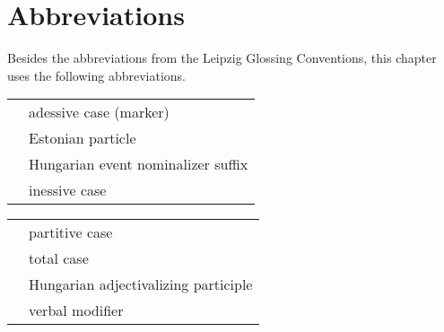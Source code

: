 \documentclass[output=paper,hidelinks]{langscibook}
\begin{document}
\section*{Abbreviations}

Besides the abbreviations from the Leipzig Glossing Conventions, this
chapter uses the following abbreviations.\medskip

\noindent\begin{tabularx}{.47\textwidth}{lQ}
 & adessive case (marker)\\
 & Estonian particle\\
 & Hungarian event nominalizer suffix\\
 & inessive case\\
\end{tabularx}%
\noindent\begin{tabularx}{.47\textwidth}{lQ}
 & partitive case\\
 & total case\\
 & Hungarian adjectivalizing participle\\
 & verbal modifier\\
\end{tabularx}

\sloppy
\printbibliography[heading=subbibliography,notkeyword=this]
\end{document}
